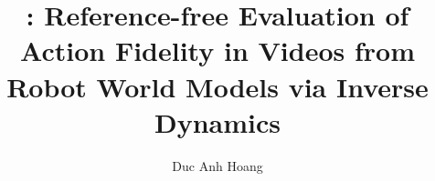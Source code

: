\documentclass[10pt,twocolumn,letterpaper]{article}
\title{\ours{}: Reference-free Evaluation of Action Fidelity in Videos from Robot World Models via Inverse Dynamics}
\author{Duc Anh Hoang}
\begin{document}
\maketitle









{
    \footnotesize
    
    
}

\appendix

\end{document}
